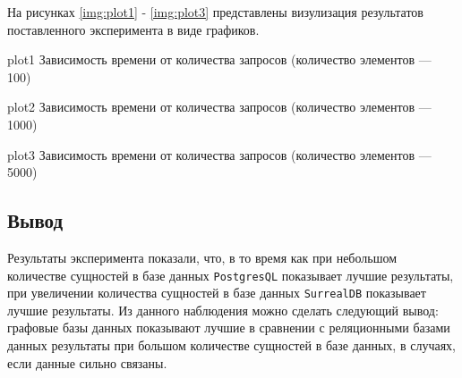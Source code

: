 \begin{table}[ht!]
	\centering
	\caption{Результаты сравнения времени, для запросов к \texttt{PostgreSQL} и \texttt{SurrealDB} (количество элементов - 5000 единиц)}
	\label{tbl:experiment3}
\end{table}

На рисунках \ref{img:plot1} - \ref{img:plot3} представлены визулизация результатов поставленного эксперимента в виде графиков.

\img{100mm}
{plot1}
{Зависимость времени от количества запросов (количество элементов --- 100)}

\img{100mm}
{plot2}
{Зависимость времени от количества запросов (количество элементов --- 1000)}

\img{100mm}
{plot3}
{Зависимость времени от количества запросов (количество элементов --- 5000)}

\clearpage

\subsection*{Вывод}
Результаты эксперимента показали, что, в то время как при небольшом количестве сущностей в базе данных \texttt{PostgresQL} показывает лучшие результаты, при увеличении количества сущностей в базе данных \texttt{SurrealDB} показывает лучшие результаты.
Из данного наблюдения можно сделать следующий вывод:
графовые базы данных показывают лучшие в сравнении с реляционными базами данных результаты при большом количестве сущностей в базе данных, в случаях, если данные сильно связаны.

